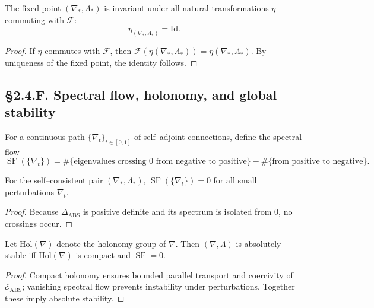 \begin{theorem}
The fixed point $(\nabla_\ast,\Lambda_\ast)$ is invariant under all natural transformations $\eta$ commuting with $\mathcal{F}$:
\[
\eta_{(\nabla_\ast,\Lambda_\ast)}=\mathrm{Id}.
\]
\end{theorem}

\begin{proof}
If $\eta$ commutes with $\mathcal{F}$, then $\mathcal{F}(\eta(\nabla_\ast,\Lambda_\ast))=\eta(\nabla_\ast,\Lambda_\ast)$.  
By uniqueness of the fixed point, the identity follows.
\end{proof}

\subsection*{§2.4.F. Spectral flow, holonomy, and global stability}

\begin{definition}
For a continuous path $\{\nabla_t\}_{t\in[0,1]}$ of self–adjoint connections, define the spectral flow
\[
\operatorname{SF}(\{\nabla_t\})
= \#\{\text{eigenvalues crossing 0 from negative to positive}\}
-\#\{\text{from positive to negative}\}.
\]
\]
\end{definition}

\begin{lemma}\label{lem:2.4.sf}
For the self–consistent pair $(\nabla_\ast,\Lambda_\ast)$, $\operatorname{SF}(\{\nabla_t\})=0$ for all small perturbations $\nabla_t$.
\end{lemma}

\begin{proof}
Because $\Delta_{\mathrm{ABS}}$ is positive definite and its spectrum is isolated from $0$, no crossings occur.
\end{proof}

\begin{theorem}\label{thm:2.4.hol}
Let $\mathrm{Hol}(\nabla)$ denote the holonomy group of $\nabla$.  
Then $(\nabla,\Lambda)$ is absolutely stable iff $\mathrm{Hol}(\nabla)$ is compact and $\operatorname{SF}=0$.
\end{theorem}

\begin{proof}
Compact holonomy ensures bounded parallel transport and coercivity of $\mathcal{E}_{\mathrm{ABS}}$; vanishing spectral flow prevents instability under perturbations.  Together these imply absolute stability.
\end{proof}

